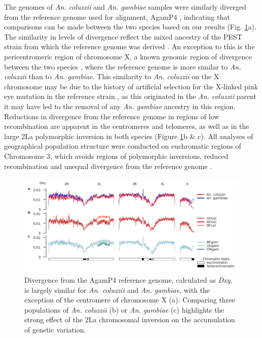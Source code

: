 \documentclass[a4paper,11pt,abstracton,hidelinks]{scrartcl}
\begin{document}
The genomes of \textit{An. coluzzii} and \textit{An. gambiae} samples were similarly diverged from the reference genome used for alignment, AgamP4 \cite{Holt2002}, indicating that comparisons can be made between the two species based on our results (Fig. \ref{refdiff}a).
%
The similarity in levels of divergence reflect the mixed ancestry of the PEST strain from which the reference genome was derived \cite{Holt2002}.
%
An exception to this is the pericentromeric region of chromosome X, a known genomic region of divergence between the two species \cite{Ag1000gConsortium2017}, where the reference genome is more similar to \textit{An. coluzzii} than to \textit{An. gambiae}.
%
This similarity to \textit{An. coluzzii} on the X chromosome may be due to the history of artificial selection for the X-linked pink eye mutation in the reference strain \cite{Holt2002}, as this originated in the \textit{An. coluzzii} parent it may have led to the removal of any \textit{An. gambiae} ancestry in this region.
%
Reductions in divergence from the reference genome in regions of low recombination are apparent in the centromeres and telomeres, as well as in the large 2La polymorphic inversion in both species \cite{coluzzi2002} (Figure \ref{refdiff}b \& c). 
%
All analyses of geographical population structure were conducted on euchromatic regions of Chromosome 3, which avoids regions of polymorphic inversions, reduced recombination and unequal divergence from the reference genome \cite{Ag1000gConsortium2017}.

\begin{figure}[h]
	\begin{center}
		\includegraphics*[width=6.3in]{notebooks/refdiff/refdiff_phase2_combined.jpg}
	\end{center}
	\caption{Divergence from the AgamP4 reference genome, calculated as \textit{Dxy}, is largely similar for \textit{An. coluzzii} and \textit{An. gambiae}, with the exception of the centromere of chromosome X (a). Comparing three populations of \textit{An. coluzzii} (b) or \textit{An. gambiae} (c) highlights the strong effect of the 2La chromosomal inversion on the accumulation of genetic variation.}
	\label{refdiff}
\end{figure}
\end{document}

